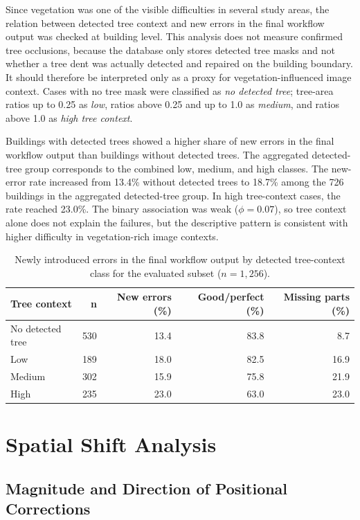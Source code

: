 Since vegetation was one of the visible difficulties in several study areas, the relation between detected tree context and new errors in the final workflow output was checked at building level. This analysis does not measure confirmed tree occlusions, because the database only stores detected tree masks and not whether a tree dent was actually detected and repaired on the building boundary. It should therefore be interpreted only as a proxy for vegetation-influenced image context. Cases with no tree mask were classified as \textit{no detected tree}; tree-area ratios up to 0.25 as \textit{low}, ratios above 0.25 and up to 1.0 as \textit{medium}, and ratios above 1.0 as \textit{high tree context}.

Buildings with detected trees showed a higher share of new errors in the final workflow output than buildings without detected trees. The aggregated detected-tree group corresponds to the combined low, medium, and high classes. The new-error rate increased from 13.4\% without detected trees to 18.7\% among the 726 buildings in the aggregated detected-tree group. In high tree-context cases, the rate reached 23.0\%. The binary association was weak (\(\phi=0.07\)), so tree context alone does not explain the failures, but the descriptive pattern is consistent with higher difficulty in vegetation-rich image contexts.

\begin{table}[htb]
\centering
\caption{Newly introduced errors in the final workflow output by detected tree-context class for the evaluated subset (\(n=1,256\)).}
\label{tab:new_errors_tree_context}
\begin{tabular}{lrrrr}
\toprule
Tree context & n & New errors (\%) & Good/perfect (\%) & Missing parts (\%) \\
\midrule
No detected tree & 530 & 13.4 & 83.8 & 8.7 \\
Low              & 189 & 18.0 & 82.5 & 16.9 \\
Medium           & 302 & 15.9 & 75.8 & 21.9 \\
High             & 235 & 23.0 & 63.0 & 23.0 \\
\bottomrule
\end{tabular}
\end{table}

\section{Spatial Shift Analysis}

\subsection{Magnitude and Direction of Positional Corrections}

